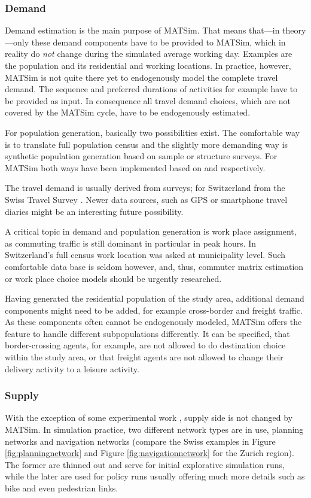 \subsubsection{Demand}
Demand estimation is the main purpose of MATSim. That means that---in theory---only these demand components have to be provided to MATSim, which in reality do \emph{not} change during the simulated average working day. Examples are the population and its residential and working locations. In practice, however, MATSim is not quite there yet to endogenously model the complete travel demand. The sequence and preferred durations of activities for example have to be provided as input. In consequence all travel demand choices, which are not covered by the MATSim cycle, have to be endogenously estimated. 

For population generation, basically two possibilities exist. The comfortable way is to translate full population census and the slightly more demanding way is synthetic population generation \citep[e.g.,\,][]{GuoBhat_TRR_2007} based on sample or structure surveys. For MATSim both ways have been implemented based on \citet[][]{BfS_VZ_2000} and \citet[][]{Mueller_unpub_STRC_2011} respectively.

The travel demand is usually derived from surveys; for Switzerland from the Swiss Travel Survey \citep[][]{BfS-MZ2005_manual_2006}. Newer data sources, such as GPS or smartphone travel diaries might be an interesting future possibility.

A critical topic in demand and population generation is work place assignment, as commuting traffic is still dominant in particular in peak hours. In Switzerland's full census work location was asked at municipality level. Such comfortable data base is seldom however, and, thus, commuter matrix estimation or work place choice models should be urgently researched.

Having generated the residential population of the study area, additional demand components might need to be added, for example cross-border and freight traffic. As these components often cannot be endogenously modeled, MATSim offers the feature to handle different subpopulations differently. It can be specified, that border-crossing agents, for example, are not allowed to do destination choice within the study area, or that freight agents are not allowed to change their delivery activity to a leisure activity.

\subsubsection{Supply}
With the exception of some experimental work \citep[][]{HorniEtAl_TechRep_IVT_2012}, supply side is not changed by MATSim. In simulation practice, two different network types are in use, planning networks and navigation networks (compare the Swiss examples in Figure \ref{fig:planningnetwork} and Figure \ref{fig:navigationnetwork} for the Zurich region). The former are thinned out and serve for initial explorative simulation runs, while the later are used for policy runs usually offering much more details such as bike and even pedestrian links.

